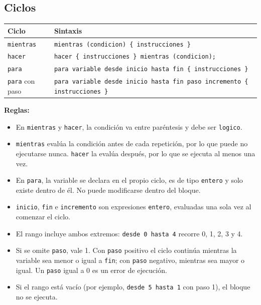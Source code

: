 \documentclass[spanish,11pt,letterpaper]{article}
\begin{document}
	\subsection{Ciclos}
	\begin{center}
		\begin{tabular}{@{}ll@{}}
			\toprule
			\textbf{Ciclo} & \textbf{Sintaxis} \\
			\midrule
			\texttt{mientras} & \texttt{mientras (condicion) \{ instrucciones \}} \\
			\texttt{hacer} & \texttt{hacer \{ instrucciones \} mientras (condicion);} \\
			\texttt{para} & \texttt{para variable desde inicio hasta fin \{ instrucciones \}} \\
			\texttt{para} con paso & \texttt{para variable desde inicio hasta fin paso incremento \{ instrucciones \}} \\
			\bottomrule
		\end{tabular}
	\end{center}
	
	\textbf{Reglas:}
	\begin{itemize}
		\item En \texttt{mientras} y \texttt{hacer}, la condici\'on va entre
		par\'entesis y debe ser \texttt{logico}.
		\item \texttt{mientras} eval\'ua la condici\'on antes de cada repetici\'on,
		por lo que puede no ejecutarse nunca. \texttt{hacer} la eval\'ua
		despu\'es, por lo que se ejecuta al menos una vez.
		\item En \texttt{para}, la variable se declara en el propio ciclo, es de
		tipo \texttt{entero} y solo existe dentro de \'el. No puede
		modificarse dentro del bloque.
		\item \texttt{inicio}, \texttt{fin} e \texttt{incremento} son
		expresiones \texttt{entero}, evaluadas una sola vez al comenzar
		el ciclo.
		\item El rango incluye ambos extremos: \texttt{desde 0 hasta 4} recorre
		0, 1, 2, 3 y 4.
		\item Si se omite \texttt{paso}, vale 1. Con \texttt{paso} positivo el
		ciclo contin\'ua mientras la variable sea menor o igual a
		\texttt{fin}; con \texttt{paso} negativo, mientras sea mayor o
		igual. Un \texttt{paso} igual a 0 es un error de ejecuci\'on.
		\item Si el rango est\'a vac\'io (por ejemplo, \texttt{desde 5 hasta 1}
		con paso 1), el bloque no se ejecuta.
	\end{itemize}
	
\end{document}
